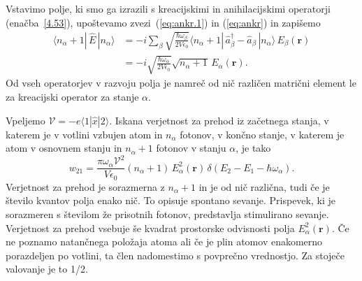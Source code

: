 Vstavimo polje, ki smo ga izrazili s kreacijskimi in anihilacijskimi operatorji (enačba~\ref{4.53}),
upoštevamo zvezi~(\ref{eq:ankr.1}) in (\ref{eq:ankr}) in zapišemo
\begin{align}
\langle n_{\alpha}+1|\, \hat{E}\,|n_{\alpha}\rangle & = 
 -i\sum_{\beta}\sqrt{\frac{\hbar\omega_{\beta}}{2V\epsilon_{0}}}
\langle n_{\alpha}+1|\,\hat{a}_{\beta}^{\dagger}-\hat{a}_{\beta}\,|n_{\alpha}\rangle\, 
E_{\beta}(\mathbf{r})\nonumber \\
 & =  -i\sqrt{\frac{\hbar\omega_{\alpha}}{2V\epsilon_{0}}}
 \sqrt{n_{\alpha}+1}\, E_{\alpha}(\mathbf{r}).
\end{align}
Od vseh operatorjev v razvoju polja je namreč od nič različen matrični
element le za kreacijski operator za stanje $\alpha$.

Vpeljemo $\mathcal{V} = -e \langle1|\hat{x}|2\rangle$.
 Iskana verjetnost za prehod iz 
začetnega stanja, v katerem je v votlini vzbujen atom in $n_{\alpha}$ fotonov, v končno
stanje, v katerem je atom v osnovnem stanju in $n_{\alpha}+1$ fotonov v stanju $\alpha$, je tako
\begin{equation}
w_{21}=\frac{\pi \omega_{\alpha}\mathcal{V}^{2}}{V\epsilon_{0}}
(n_{\alpha}+1)\,E_{\alpha}^{2}(\mathbf{r})\,\delta(E_{2}-E_{1}-\hbar\omega_{\alpha}).
\label{4.56}
\end{equation}
Verjetnost za prehod je sorazmerna z $n_{\alpha}+1$ in je od nič
različna, tudi če je število kvantov polja enako nič. To opisuje 
spontano sevanje. Prispevek, ki je 
sorazmeren s številom že prisotnih fotonov, predstavlja stimulirano 
sevanje. Verjetnost za prehod vsebuje
še kvadrat prostorske odvisnosti polja $E_{\alpha}^{2}(\mathbf{r})$.
Če ne poznamo natančnega položaja atoma ali če je plin atomov enakomerno
porazdeljen po votlini, ta člen nadomestimo s povprečno vrednostjo.
Za stoječe valovanje je to 1/2.

